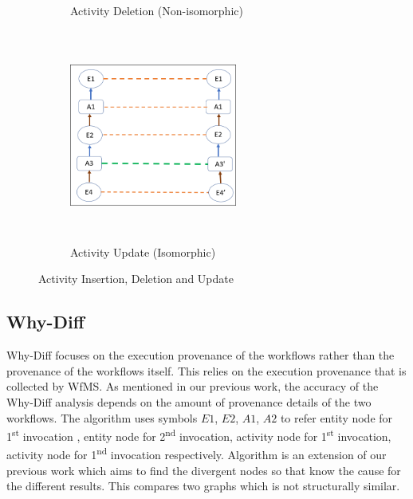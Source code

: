 \documentclass[10pt,conference,twocolumn]{IEEEtran}
\begin{document}
\begin{enumerate}
\begin{figure}
\begin{subfigure}{.33\textwidth}
  \caption{Activity Deletion (Non-isomorphic)}
\label{fig: Activity Deletion}
\end{subfigure}
\begin{subfigure}{.33\textwidth}
  \centering
  \includegraphics[width=5.5cm,height=7cm]{ActivityUpdate.png}
  \caption{Activity Update (Isomorphic)}
\label{fig: Activity Update}
\end{subfigure}%
\label{fig:test}
\caption{Activity Insertion, Deletion and Update}
\end{figure}
\end{enumerate}

\subsection{Why-Diff}
Why-Diff focuses on the execution provenance of the workflows rather than the provenance of the workflows itself. This relies on the execution provenance that is collected by WfMS. As mentioned in our previous work, the accuracy of the Why-Diff analysis depends on the amount of provenance details of the two workflows. The algorithm uses symbols  $E1$, $E2$, $A1$, $A2$ to refer entity node for 1\textsuperscript{st} invocation , entity node for 2\textsuperscript{nd} invocation, activity node for 1\textsuperscript{st} invocation, activity node for 1\textsuperscript{nd} invocation respectively. Algorithm is an extension of our previous work  \cite{Priyaa} which aims to find the divergent nodes so that know the cause for the different results. This compares two graphs which is not structurally similar. 
\end{document}
